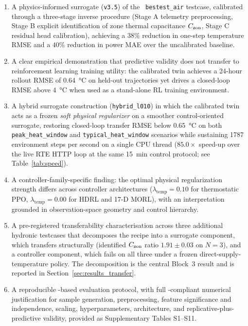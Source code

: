 \begin{enumerate}
    \item A physics-informed surrogate (\texttt{v3.5}) of the \boptest\
    \texttt{bestest\_air} testcase, calibrated through a three-stage inverse
    procedure (Stage A telemetry preprocessing, Stage B explicit identification
    of zone thermal capacitance $C_{\mathrm{zon}}$, Stage C residual head calibration),
    achieving a $38\%$ reduction in one-step temperature RMSE and a $40\%$
    reduction in power MAE over the uncalibrated baseline.
    \item A clear empirical demonstration that predictive validity does not
    transfer to reinforcement learning training utility: the calibrated twin
    achieves a 24-hour rollout RMSE of \SI{0.64}{\celsius} on held-out
    trajectories yet drives a closed-loop \boptest{} RMSE above
    \SI{4}{\celsius} when used as a stand-alone RL training environment.
    \item A hybrid surrogate construction (\texttt{hybrid\_l010}) in which the
    calibrated twin acts as a frozen \emph{soft physical regularizer} on a
    smoother control-oriented surrogate, restoring closed-loop transfer RMSE
    below \SI{0.65}{\celsius} on both \texttt{peak\_heat\_window} and
    \texttt{typical\_heat\_window} scenarios while sustaining
    \num{1787} environment steps per second on a single CPU thread
    ($85.0\times$ speed-up over the live \boptest{} RTE HTTP loop at the
    same \SI{15}{\minute} control protocol; see
    Table~\ref{tab:speed}).
    \item A controller-family-specific finding: the optimal physical
    regularization strength differs across controller architectures
    ($\lambda_{\mathrm{temp}}=0.10$ for thermostatic PPO,
    $\lambda_{\mathrm{temp}}=0.00$ for HDRL and 17-D MORL), with an
    interpretation grounded in observation-space geometry and control
    hierarchy.
    \item A pre-registered transferability characterisation across three
    additional \boptest{} hydronic testcases that decomposes the
    recipe into a surrogate component, which transfers structurally
    (identified $C_{\mathrm{zon}}$ ratio $1.91\pm0.03$ on $N=3$), and a
    controller component, which fails on all three under a frozen
    direct-supply-temperature policy. The decomposition is the central
    Block~3 result and is reported in Section~\ref{sec:results_transfer}.
    \item A reproducible \boptest-based evaluation protocol, with full
    \cite{HouEvins2024}-compliant numerical justification for sample
    generation, preprocessing, feature significance and independence,
    scaling, hyperparameters, architecture, and replicative-plus-predictive
    validity, provided as Supplementary Tables S1--S11.
\end{enumerate}


